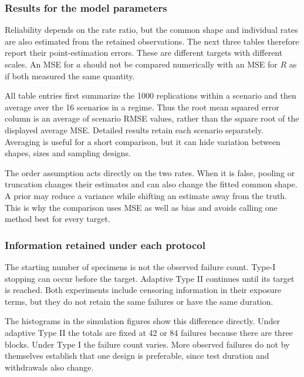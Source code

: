 \subsubsection{Results for the model parameters}\label{sec:parameter-results}
Reliability depends on the rate ratio, but the common shape and individual rates are also estimated from the retained observations. The next three tables therefore report their point-estimation errors. These are different targets with different scales. An MSE for $a$ should not be compared numerically with an MSE for $R$ as if both measured the same quantity.





All table entries first summarize the 1000 replications within a scenario and then average over the 16 scenarios in a regime. Thus the root mean squared error column is an average of scenario RMSE values, rather than the square root of the displayed average MSE. Detailed results retain each scenario separately. Averaging is useful for a short comparison, but it can hide variation between shapes, sizes and sampling designs.

The order assumption acts directly on the two rates. When it is false, pooling or truncation changes their estimates and can also change the fitted common shape. A prior may reduce a variance while shifting an estimate away from the truth. This is why the comparison uses MSE as well as bias and avoids calling one method best for every target.



\subsubsection{Information retained under each protocol}\label{sec:retained-information}
The starting number of specimens is not the observed failure count. Type-I stopping can occur before the target. Adaptive Type II continues until its target is reached. Both experiments include censoring information in their exposure terms, but they do not retain the same failures or have the same duration.

The histograms in the simulation figures show this difference directly. Under adaptive Type II the totals are fixed at 42 or 84 failures because there are three blocks. Under Type I the failure count varies. More observed failures do not by themselves establish that one design is preferable, since test duration and withdrawals also change.
